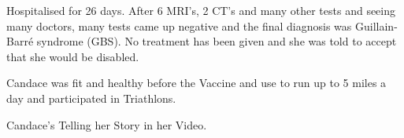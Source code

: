 Hospitalised for 26 days. After 6 MRI’s, 2 CT’s and many other tests and seeing
many doctors, many tests came up negative and the final diagnosis was
Guillain-Barré syndrome (GBS). No treatment has been given and she was told to
accept that she would be disabled.

Candace was fit and healthy before the Vaccine and use to run up to 5 miles a
day and participated in Triathlons.

Candace’s Telling her Story in her Video.

